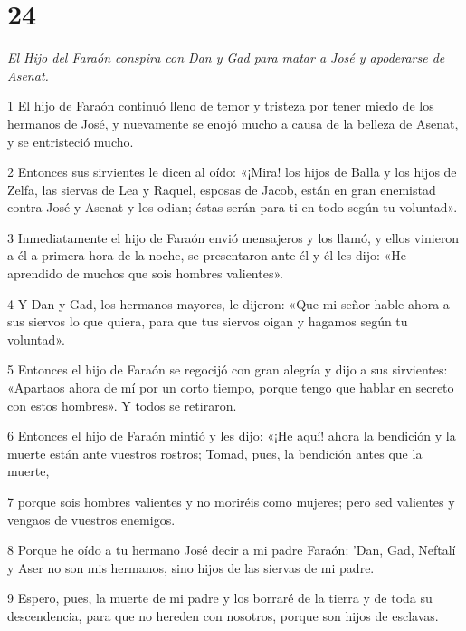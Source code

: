 \chapter{24}

\par \textit{El Hijo del Faraón conspira con Dan y Gad para matar a José y apoderarse de Asenat.}


\par 1 El hijo de Faraón continuó lleno de temor y tristeza por tener miedo de los hermanos de José, y nuevamente se enojó mucho a causa de la belleza de Asenat, y se entristeció mucho.

\par 2 Entonces sus sirvientes le dicen al oído: «¡Mira! los hijos de Balla y los hijos de Zelfa, las siervas de Lea y Raquel, esposas de Jacob, están en gran enemistad contra José y Asenat y los odian; éstas serán para ti en todo según tu voluntad».

\par 3 Inmediatamente el hijo de Faraón envió mensajeros y los llamó, y ellos vinieron a él a primera hora de la noche, se presentaron ante él y él les dijo: «He aprendido de muchos que sois hombres valientes».

\par 4 Y Dan y Gad, los hermanos mayores, le dijeron: «Que mi señor hable ahora a sus siervos lo que quiera, para que tus siervos oigan y hagamos según tu voluntad».

\par 5 Entonces el hijo de Faraón se regocijó con gran alegría y dijo a sus sirvientes: «Apartaos ahora de mí por un corto tiempo, porque tengo que hablar en secreto con estos hombres». Y todos se retiraron.

\par 6 Entonces el hijo de Faraón mintió y les dijo: «¡He aquí! ahora la bendición y la muerte están ante vuestros rostros; Tomad, pues, la bendición antes que la muerte,

\par 7 porque sois hombres valientes y no moriréis como mujeres; pero sed valientes y vengaos de vuestros enemigos.

\par 8 Porque he oído a tu hermano José decir a mi padre Faraón: 'Dan, Gad, Neftalí y Aser no son mis hermanos, sino hijos de las siervas de mi padre.

\par 9 Espero, pues, la muerte de mi padre y los borraré de la tierra y de toda su descendencia, para que no hereden con nosotros, porque son hijos de esclavas.

